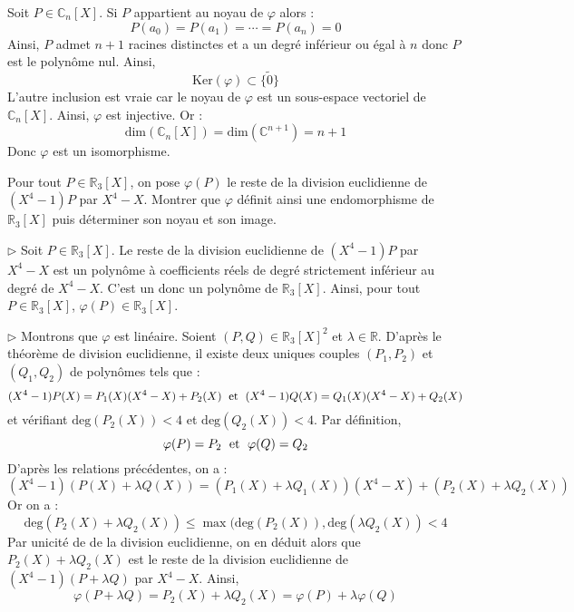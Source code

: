 \documentclass[a4paper,10pt]{report}
\begin{document}
\medskip

\noindent Soit $P \in \mathbb{C}_n[X]$. Si $P$ appartient au noyau de $\varphi$ alors :
$$ P(a_0) = P(a_1) = \cdots = P(a_n) = 0$$
Ainsi, $P$ admet $n+1$ racines distinctes et a un degré inférieur ou égal à $n$ donc $P$ est le polynôme nul. Ainsi,
$$ \textrm{Ker}(\varphi) \subset \lbrace \tilde{0} \rbrace$$
L'autre inclusion est vraie car le noyau de $\varphi$ est un sous-espace vectoriel de $\mathbb{C}_n[X]$. Ainsi, $\varphi$ est injective. Or :
$$ \textrm{dim}(\mathbb{C}_n[X]) = \textrm{dim}(\mathbb{C}^{n+1}) = n+1$$
Donc $\varphi$ est un isomorphisme.

\medskip

\begin{Exa} Pour tout $P \in \mathbb{R}_3[X]$, on pose $\varphi(P)$ le reste de la division euclidienne de $(X^4-1)P$ par $X^4-X$. Montrer que $\varphi$ définit ainsi une endomorphisme de $\mathbb{R}_3[X]$ puis déterminer son noyau et son image.
\end{Exa} 

\corr 

\medskip

\noindent $\rhd$ Soit $P\in \mathbb{R}_3[X]$. Le reste de la division euclidienne de $(X^4-1)P$ par $X^4-X$ est un polynôme à coefficients réels de degré strictement inférieur au degré de $X^4-X$. C'est un donc un polynôme de $\mathbb{R}_3[X]$. Ainsi, pour tout $P \in \mathbb{R}_3[X]$, $\varphi(P) \in \mathbb{R}_3[X]$.

\medskip

\noindent $\rhd$ Montrons que $\varphi$ est linéaire. Soient $(P,Q) \in \mathbb{R}_3[X]^2$ et $\lambda \in \mathbb{R}$. D'après le théorème de division euclidienne, il existe deux uniques couples $(P_1,P_2)$ et $(Q_1,Q_2)$ de polynômes tels que :
$$ (X^4-1)P(X) = P_1(X)(X^4-X)+ P_2(X) \; \hbox{ et } \; (X^4-1)Q(X) = Q_1(X)(X^4-X)+ Q_2(X)$$
et vérifiant $\textrm{deg}(P_2(X))<4$ et $\textrm{deg}(Q_2(X))<4$. Par définition,
$$ \varphi(P)= P_2 \; \hbox{ et } \; \varphi(Q) = Q_2$$
D'après les relations précédentes, on a :
$$ (X^4-1)(P(X) + \lambda Q(X))  = (P_1(X)+ \lambda Q_1(X))(X^4-X) + (P_2(X)+ \lambda Q_2(X))$$
Or on a :
$$ \textrm{deg}(P_2(X)+ \lambda Q_2(X)) \leq \max(\textrm{deg}(P_2(X)), \textrm{deg}(\lambda Q_2(X))<4$$
Par unicité de de la division euclidienne, on en déduit alors que $P_2(X)+ \lambda Q_2(X)$ est le reste de la division euclidienne de $(X^4-1)(P+ \lambda Q)$ par $X^4-X$. Ainsi,
 $$\varphi(P + \lambda Q) = P_2(X)+ \lambda Q_2(X) = \varphi(P) + \lambda \varphi(Q)$$
\end{document}

